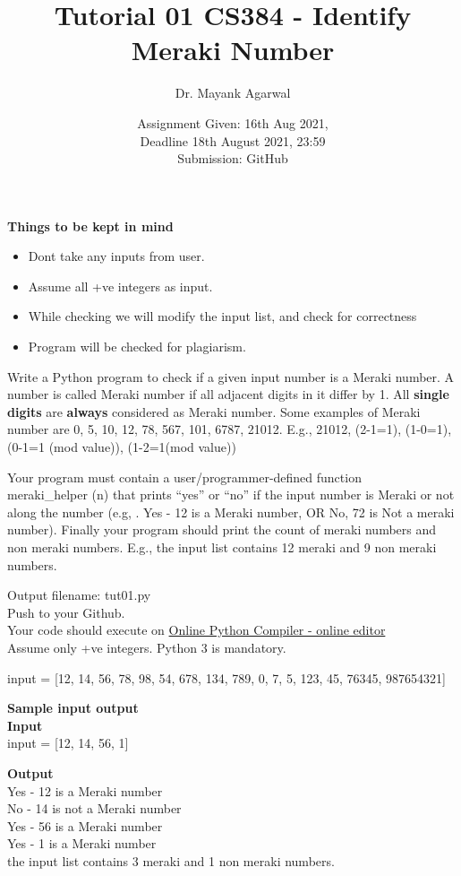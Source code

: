 \documentclass[12pt,  letterpaper,  twoside]{article}
\title{Tutorial 01 CS384 - Identify Meraki Number}
\author{Dr. Mayank Agarwal}
\date{Assignment Given: 16th Aug 2021,\\ Deadline 18th August 2021,  
23:59\\Submission: GitHub }
\begin{document}
	\maketitle  
	\textbf{Things to be kept in mind}\\
	\begin{itemize}
		\item Dont take any inputs from user. 
		\item Assume all +ve integers as input.
		\item While checking we will modify the input list, and check for 
		correctness 
		\item Program will be checked for plagiarism. 
		
	\end{itemize}
	
	Write a Python program to check if a given input number is a Meraki number. A number is called Meraki number if all adjacent digits in it differ by 1. All \textbf{single digits }are \textbf{always }considered as Meraki number. Some examples of Meraki number are 0,  5,  10,  12,  78,  567,  101,  6787,  21012.  E.g.,  21012,  (2-1=1),  (1-0=1),  (0-1=1 (mod value)),  (1-2=1(mod value))
	
	
	 Your program must contain a user/programmer-defined function \\  meraki\_helper (n) that prints “yes” or “no” if the input number is Meraki or not along the number (e.g, . Yes - 12 is a Meraki number,  OR No,  72 is Not a meraki number). Finally your program should print the count of meraki numbers and non meraki numbers. E.g., the input list contains 12 meraki and 9 non meraki numbers.
	  
	 Output filename: tut01.py \\
	 Push to your Github. \\
	 Your code should execute on
	 \href{https://www.onlinegdb.com/online_python_compiler}{Online Python Compiler - online editor} \\
	 Assume only +ve integers. Python 3 is mandatory.
	 
	 input = [12,  14, 56, 78, 98, 54, 678, 134, 789, 0, 7, 5,  123,  45, 76345,  987654321]
	
	
	\textbf{Sample input output }\\
	
	 \textbf{Input}\\
		\noindent	input = [12,  14, 56, 1]
	
	 \textbf{Output}\\
	\noindent	
	Yes - 12 is a Meraki number \\
		No - 14 is not a Meraki number \\
			Yes - 56 is a Meraki number \\
				Yes - 1 is a Meraki number \\
	 the input list contains 3 meraki and 1 non meraki numbers.
\end{document}
